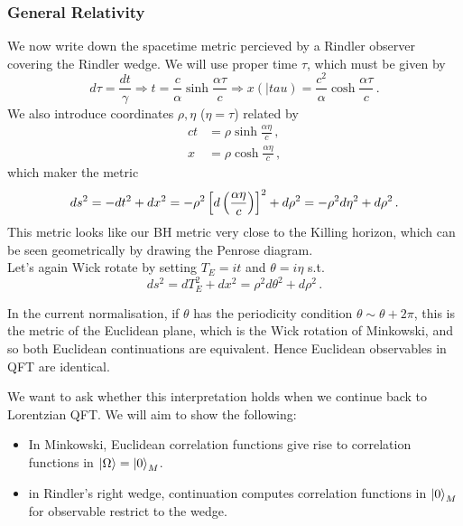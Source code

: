 \documentclass{article}
\begin{document}
\subsubsection{General Relativity}
We now write down the spacetime metric percieved by a Rindler observer covering the Rindler wedge. We will use proper time $\tau$, which must be given by 
\[
d\tau = \frac{dt}{\gamma} \Rightarrow t = \frac{c}{\alpha} \sinh \frac{\alpha \tau}{c} \Rightarrow x(|tau) = \frac{c^2}{\alpha} \cosh \frac{\alpha \tau}{c} \, .
\]
We also introduce coordinates $\rho, \eta$ ($\eta=\tau$) related by 
\begin{align*}
	ct &= \rho \sinh \frac{\alpha \eta}{c} \, , \\ 
	x &= \rho \cosh \frac{\alpha \eta}{c} \, ,
\end{align*}
which maker the metric 
\[
ds^2 = -dt^2 +dx^2 = -\rho^2 \left[ d\left( \frac{\alpha \eta}{c} \right) \right]^2 + d\rho^2 = -\rho^2 d \eta^2 + d\rho^2 \, .
\]
This metric looks like our BH metric very close to the Killing horizon, which can be seen geometrically by drawing the Penrose diagram. \\
Let's again Wick rotate by setting $T_E = it$ and $\theta = i\eta$ s.t. 
\[
ds^2 = dT_E^2 + dx^2 = \rho^2 d\theta^2 + d\rho^2 \, .
\]
\begin{remark}
	In the current normalisation, if $\theta$ has the periodicity condition $\theta \sim \theta+2\pi$, this is the metric of the Euclidean plane, which is the Wick rotation of Minkowski, and so both Euclidean continuations are equivalent. Hence Euclidean observables in QFT are identical. 
\end{remark}
We want to ask whether this interpretation holds when we continue back to Lorentzian QFT. We will aim to show the following:
\begin{itemize}
	\item In Minkowski, Euclidean correlation functions give rise to correlation functions in $\ket{\Omega} = \ket{0}_M$. 
	\item in Rindler's right wedge, continuation computes correlation functions in $\ket{0}_M$ for observable restrict to the wedge. 
\end{itemize}
\end{document}
